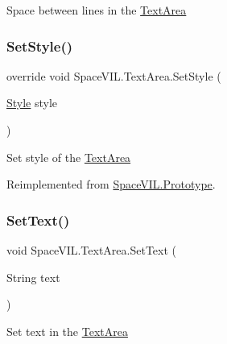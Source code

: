 Space between lines in the \mbox{\hyperlink{class_space_v_i_l_1_1_text_area}{Text\+Area}} 

\mbox{\label{class_space_v_i_l_1_1_text_area_a348d8c59439854876e894867fea7c7c1}} 
\subsubsection{\texorpdfstring{Set\+Style()}{SetStyle()}}
{\footnotesize\ttfamily override void Space\+V\+I\+L.\+Text\+Area.\+Set\+Style (\begin{DoxyParamCaption}\item[{\mbox{\hyperlink{class_space_v_i_l_1_1_decorations_1_1_style}{Style}}}]{style }\end{DoxyParamCaption})\hspace{0.3cm}{\ttfamily [virtual]}}



Set style of the \mbox{\hyperlink{class_space_v_i_l_1_1_text_area}{Text\+Area}} 



Reimplemented from \mbox{\hyperlink{class_space_v_i_l_1_1_prototype_ae96644a6ace490afb376fb542161e541}{Space\+V\+I\+L.\+Prototype}}.

\mbox{\label{class_space_v_i_l_1_1_text_area_a5c1fcd7e4bcf6c9a508d997f59b27bcb}} 
\subsubsection{\texorpdfstring{Set\+Text()}{SetText()}}
{\footnotesize\ttfamily void Space\+V\+I\+L.\+Text\+Area.\+Set\+Text (\begin{DoxyParamCaption}\item[{String}]{text }\end{DoxyParamCaption})}



Set text in the \mbox{\hyperlink{class_space_v_i_l_1_1_text_area}{Text\+Area}} 

\mbox{\label{class_space_v_i_l_1_1_text_area_a4c109ddb93c025558a90184754f59de8}} 
